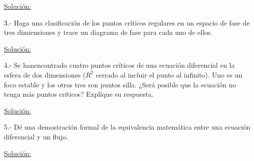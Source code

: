 \documentclass[a4paper,10pt]{article}
\begin{document}
\vspace{.3cm}

\underline{Solución:}

\vspace{.3cm}

3.- Haga una clasificación de los puntos críticos regulares en un espacio de fase 
de tres dimiensiones y trace un diagrama de fase para cada uno de ellos.

\vspace{.3cm}

\underline{Solución:}

\vspace{.3cm}

4.- Se hanencontrado cuatro puntos críticos de una ecuación diferencial en la esfera
de dos dimensiones ($R^2$ cerrado al incluir el punto al infinito). Uno es un foco
estable y los otros tres son puntos silla. ¿Será posible que la ecuación no tenga
más puntos críticos? Explique su respuesta.


\vspace{.3cm}

\underline{Solución:}

\vspace{.3cm}

5.- Dé una demostración formal de la equivalencia matemática entre una ecuación
diferencial y un flujo.

\vspace{.3cm}

\underline{Solución:}

\vspace{.3cm}
\end{document}
